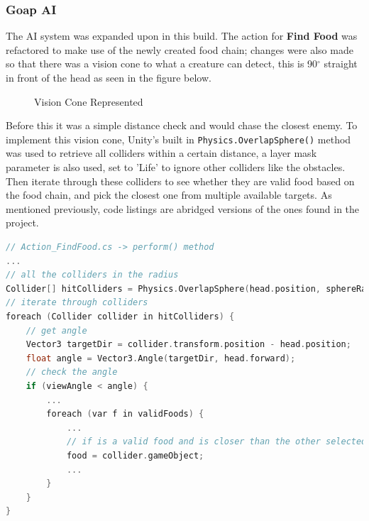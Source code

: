 \documentclass[11pt]{report}
\begin{document}
\subsubsection{Goap AI}
The AI system was expanded upon in this build. The action for \textbf{Find Food} was refactored to make use of the newly created food chain; changes were also made so that there was a vision cone to what a creature can detect, this is 90$^{\circ}$ straight in front of the head as seen in the figure below.
\begin{figure}[H]
    \centering
    \caption{Vision Cone Represented}
\end{figure}

Before this it was a simple distance check and would chase the closest enemy. To implement this vision cone, Unity's built in \lstinline{Physics.OverlapSphere()} method was used to retrieve all colliders within a certain distance, a layer mask parameter is also used, set to 'Life' to ignore other colliders like the obstacles. Then iterate through these colliders to see whether they are valid food based on the food chain, and pick the closest one from multiple available targets. As mentioned previously, code listings are abridged versions of the ones found in the project.
\begin{lstlisting}[language=c]
// Action_FindFood.cs -> perform() method
...
// all the colliders in the radius
Collider[] hitColliders = Physics.OverlapSphere(head.position, sphereRadius, lifeLayerMask);
// iterate through colliders
foreach (Collider collider in hitColliders) {
    // get angle
    Vector3 targetDir = collider.transform.position - head.position;
    float angle = Vector3.Angle(targetDir, head.forward);
    // check the angle
    if (viewAngle < angle) {
        ...
        foreach (var f in validFoods) {
            ...
            // if is a valid food and is closer than the other selected food then
            food = collider.gameObject;
            ... 
        }
    }
}
\end{lstlisting}
\end{document}
